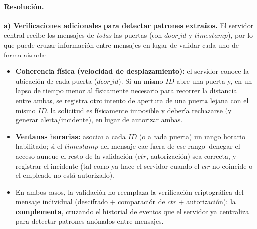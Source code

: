 \paragraph{Resolución.}

\textbf{a) Verificaciones adicionales para detectar patrones extraños.}
El servidor central recibe los mensajes de \emph{todas} las puertas (con
$door\_id$ y $timestamp$), por lo que puede cruzar información entre mensajes en
lugar de validar cada uno de forma aislada:
\begin{itemize}
  \item \textbf{Coherencia física (velocidad de desplazamiento):} el servidor
  conoce la ubicación de cada puerta ($door\_id$). Si un mismo $ID$ abre una puerta
  y, en un lapso de tiempo menor al físicamente necesario para recorrer la
  distancia entre ambas, se registra otro intento de apertura de una puerta lejana
  con el mismo $ID$, la solicitud es físicamente imposible y debería rechazarse
  (y generar alerta/incidente), en lugar de autorizar ambas.
  \item \textbf{Ventanas horarias:} asociar a cada $ID$ (o a cada puerta) un rango
  horario habilitado; si el $timestamp$ del mensaje cae fuera de ese rango, denegar
  el acceso aunque el resto de la validación ($ctr$, autorización) sea correcta, y
  registrar el incidente (tal como ya hace el servidor cuando el $ctr$ no coincide
  o el empleado no está autorizado).
  \item En ambos casos, la validación no reemplaza la verificación criptográfica
  del mensaje individual (descifrado + comparación de $ctr$ + autorización): la
  \textbf{complementa}, cruzando el historial de eventos que el servidor ya
  centraliza para detectar patrones anómalos entre mensajes.
\end{itemize}

